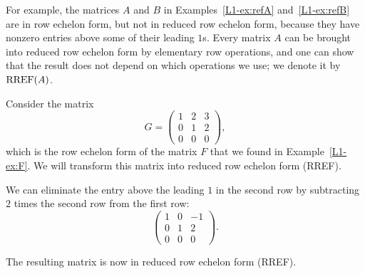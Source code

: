 For example, the matrices $A$ and $B$ in Examples~\ref{L1-ex:refA} and~\ref{L1-ex:refB} are in row echelon form, but not in reduced row echelon form, because they have nonzero entries above some of their leading $1$s. Every matrix $A$ can be brought into reduced row echelon form by elementary row operations, and one can show that the result does not depend on which operations we use; we denote it by $\operatorname{RREF}(A)$.

\begin{example}\label{L1-ex:G}
    Consider the matrix
    \[G = \begin{pmatrix}
        1 & 2 & 3 \\
        0 & 1 & 2 \\
        0 & 0 & 0
    \end{pmatrix},\]
    which is the row echelon form of the matrix $F$ that we found in Example~\ref{L1-ex:F}. We will transform this matrix into reduced row echelon form (RREF).

    We can eliminate the entry above the leading $1$ in the second row by subtracting $2$ times the second row from the first row:
    \[\begin{pmatrix}
        1 & 0 & -1 \\
        0 & 1 & 2 \\
        0 & 0 & 0
    \end{pmatrix}.\]

    The resulting matrix is now in reduced row echelon form (RREF).
\end{example}

